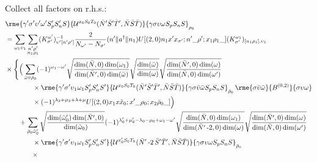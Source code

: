 \documentclass[%
  aps,%
  prc,%
  showpacs,%
  superscriptaddress,%
  onecolumn,%
  notitlepage,%
  11pt,%
  floatfix,%
  amsmath,%
  amssymb,%
]{revtex4-2}
\newcommand{\negative}{\,\text{-}}
\begin{document}
Collect all factors on r.h.s.:
\begin{align*}
  &
  \rme{\gamma'\sigma'\upsilon'\omega'S_p'S_n'S}{\mathcal{U}^{x_0 S_0 T_0}(\bar{N}'\bar{S}'\bar{T}',\bar{N}\bar{S}\bar{T})}{\gamma\sigma\upsilon\omega S_p S_n S}_{\rho_0}\\
  &=\sum_{\omega_1\upsilon_1} \sum_{\substack{n'\rho'\\n_1\rho_1}}(K_{\sigma'}^{\omega'})_{\upsilon'[n'\rho']}^{-1}\frac{2}{N_{\omega'} - N_{\sigma'}}(n'\Vert{}a^\dagger\Vert{}n_1) U[(2,0)n_1 x' x_{\sigma'};n'\_\rho';x_1\rho_1\_](K_{\sigma'}^{\omega_1})_{[n_1\rho_1],\upsilon_1}\\
  &\times\Bigg\{\Big(\sum_{\bar{\omega}\bar{\upsilon}\bar{\rho}_0}
      (-1)^{\omega_1-\omega'}
      \sqrt{\frac{\dim(\bar{N},0)\dim(\omega_1)}{\dim(\bar{N}',0)\dim(\bar{\omega})}}
      \sqrt{\frac{\dim(\bar{\omega})}{\dim(\omega)}}
      \sqrt{\frac{\dim(\bar{N}',0)\dim(\omega)}{\dim(\bar{N},0)\dim(\omega')}}
      \\
      & \qquad \qquad \times
      \rme{\gamma'\sigma'\upsilon_1\omega_1 S_p' S_n' S'}{\mathcal{U}^{x_0S_0T_0}(\bar{N}'\bar{S}'\bar{T}',\bar{N}\bar{S}\bar{T})}{\gamma \sigma \bar{\upsilon}\bar{\omega} S_p S_n S}_{\bar{\rho}_0} \, \rme{\sigma \bar{\upsilon}\bar{\omega}}{B^{(0,2)}}{\sigma \upsilon \omega}\\
  &\qquad\qquad\times
      (-1)^{\lambda_2+\mu_2+\lambda+\mu} U[(2,0) x_1 x \tilde{x}_0; x' \_ \rho_0; x_2\bar{\rho}_0\_]
    \Big)\\
  &\qquad+\sum_{\bar{\rho}_0\tilde{\omega}_0'}
  \sqrt{\frac{\dim(\tilde{\omega}_0')\dim(\bar{N}',0)}{\dim(\tilde{\omega}_0)}}
  (-1)^{\lambda_0'+\mu_0'-\lambda_0-\mu_0+\omega_1-\omega'} \sqrt{\frac{\dim(\bar{N},0)\dim(\omega_1)}{\dim(\bar{N}'\negative2,0)\dim(\omega)}} \sqrt{\frac{\dim(\bar{N}',0)\dim(\omega)}{\dim(\bar{N},0)\dim(\omega')}}\\
  & \qquad \qquad \times
  \rme{\gamma'\sigma'\upsilon_1\omega_1 S_p' S_n' S'}{\mathcal{U}^{x_0'S_0T_0}(\bar{N}'\negative2\,\bar{S}'\bar{T}',\bar{N}\bar{S}\bar{T})}{\gamma \sigma \upsilon \omega S_p S_n S}_{\bar{\rho}_0}\\
  &\qquad\qquad\times

\end{align*}
\end{document}
